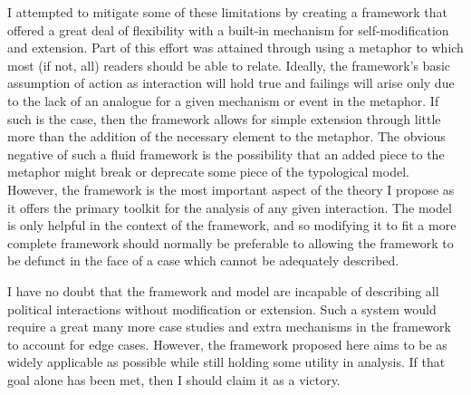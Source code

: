 \documentclass[openany,twoside]{memoir}
\begin{document}
\begin{Spacing}{2}
I attempted to mitigate some of these limitations by creating a framework that offered a great deal of flexibility with a built-in mechanism for self-modification and extension.
Part of this effort was attained through using a metaphor to which most (if not, all) readers should be able to relate.
Ideally, the framework's basic assumption of action as interaction will hold true and failings will arise only due to the lack of an analogue for a given mechanism or event in the metaphor.
If such is the case, then the framework allows for simple extension through little more than the addition of the necessary element to the metaphor.
The obvious negative of such a fluid framework is the possibility that an added piece to the metaphor might break or deprecate some piece of the typological model.
However, the framework is the most important aspect of the theory I propose as it offers the primary toolkit for the analysis of any given interaction.
The model is only helpful in the context of the framework, and so modifying it to fit a more complete framework should normally be preferable to allowing the framework to be defunct in the face of a case which cannot be adequately described.

I have no doubt that the framework and model are incapable of describing all political interactions without modification or extension.
Such a system would require a great many more case studies and extra mechanisms in the framework to account for edge cases.
However, the framework proposed here aims to be as widely applicable as possible while still holding some utility in analysis.
If that goal alone has been met, then I should claim it as a victory.


\end{Spacing}
\end{document}
